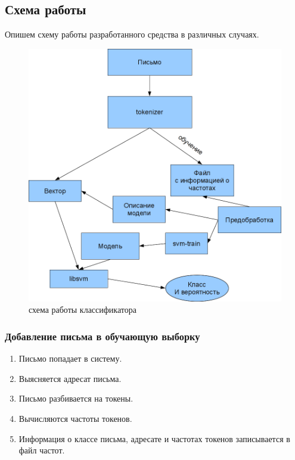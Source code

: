 \subsection{Схема работы}
Опишем схему работы разработанного средства в различных случаях.
\begin{figure}[h]
\begin{center}
\includegraphics[width=12cm]{img/working_scheme}
\end{center}
\caption{схема работы классификатора}
\label{dspamarch}
\end{figure}

\subsubsection{Добавление письма в обучающую выборку}

\begin{enumerate}
    \item Письмо попадает в систему.
    \item Выясняется адресат письма.
    \item Письмо разбивается на токены.
    \item Вычисляются частоты токенов.
    \item Информация о классе письма, адресате и частотах токенов записывается в файл частот.
\end{enumerate}

